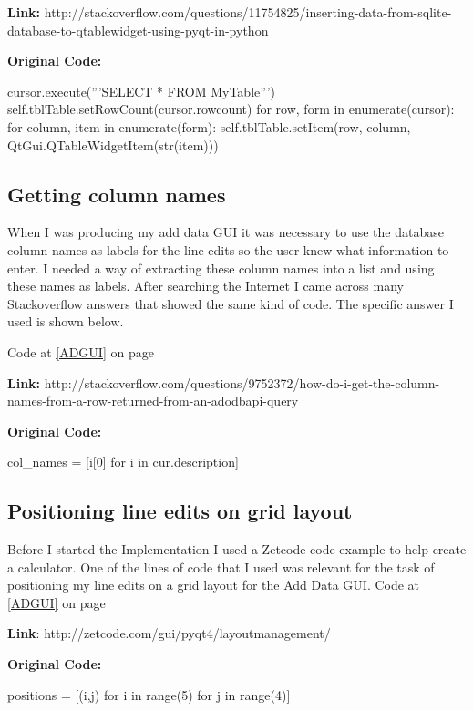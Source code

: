 \textbf{Link:} http://stackoverflow.com/questions/11754825/inserting-data-from-sqlite-database-to-qtablewidget-using-pyqt-in-python

\textbf{Original Code:}

\begin{python}
cursor.execute('''SELECT * FROM MyTable''')
self.tblTable.setRowCount(cursor.rowcount)
for row, form in enumerate(cursor):
    for column, item in enumerate(form):
        self.tblTable.setItem(row, column, QtGui.QTableWidgetItem(str(item)))   
\end{python}

\subsection{Getting column names}

When I was producing my add data GUI it was necessary to use the database column names as labels for the line edits so the user knew what information to enter. I needed a way of extracting these column names into a list and using these names as labels. After searching the Internet I came across many Stackoverflow answers that showed the same kind of code. The specific answer I used is shown below.

Code at \ref{ADGUI} on page \pageref{ADGUI}

\textbf{Link:} http://stackoverflow.com/questions/9752372/how-do-i-get-the-column-names-from-a-row-returned-from-an-adodbapi-query

\textbf{Original Code:}

\begin{python}
col_names = [i[0] for i in cur.description]
\end{python}

\subsection{Positioning line edits on grid layout}

Before I started the Implementation I used a Zetcode code example to help create a calculator. One of the lines of code that I used was relevant for the task of positioning my line edits on a grid layout for the Add Data GUI. 
Code at \ref{ADGUI} on page \pageref{ADGUI}

\textbf{Link}: http://zetcode.com/gui/pyqt4/layoutmanagement/

\textbf{Original Code:}
\begin{python}
positions = [(i,j) for i in range(5) for j in range(4)]
\end{python}

